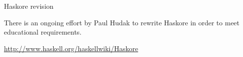\begin{hcarentry}[updated]{Haskore revision}
\begin{enumerate}
\end{enumerate}


\FuturePlans

\begin{compactitem}
\item There is an ongoing effort by Paul Hudak
to rewrite Haskore in order to meet educational requirements.
\end{compactitem}



\FurtherReading
\begin{compactitem}
\item \url{http://www.haskell.org/haskellwiki/Haskore}
\end{compactitem}
\end{hcarentry}

